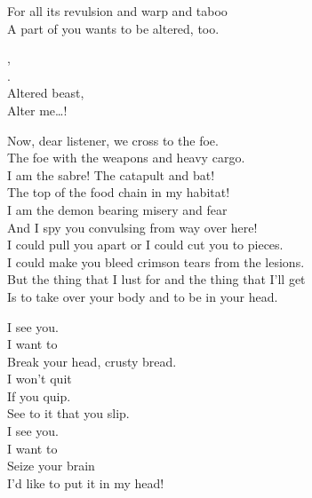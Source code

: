 
For all its revulsion and warp and taboo \\
A part of you wants to be altered, too. \\


, \\
. \\
Altered beast, \\
Alter me…! \\





Now, dear listener, we cross to the foe. \\
The foe with the weapons and heavy cargo. \\

I am the sabre! The catapult and bat! \\
The top of the food chain in my habitat! \\

I am the demon bearing misery and fear \\
And I spy you convulsing from way over here! \\

I could pull you apart or I could cut you to pieces. \\
I could make you bleed crimson tears from the lesions. \\

But the thing that I lust for and the thing that I'll get \\
Is to take over your body and to be in your head. \\


I see you. \\
I want to \\
Break your head, crusty bread. \\

I won't quit \\
If you quip. \\
See to it that you slip. \\

I see you. \\
I want to \\
Seize your brain \\
I'd like to put it in my head! \\


